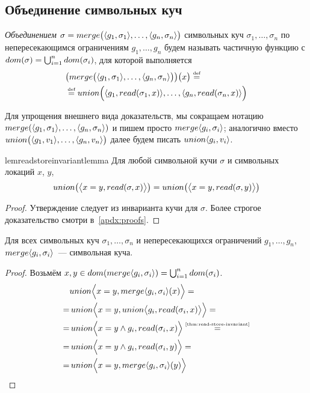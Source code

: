 \subsection{Объединение символьных куч}
%
%
\begin{defn}\label{def:heap-merge}
\emph{Объединением} $\sigma=merge\big(\langle g_1, \sigma_1\rangle,\ldots,\langle g_n, \sigma_n\rangle\big)$ символьных куч $\sigma_1,\ldots,\sigma_n$ по непересекающимся ограничениям $g_1,\ldots,g_n$ будем называть частичную функцию с $dom(\sigma)=\bigcup_{i=1}^{n}{dom(\sigma_i)}$, для которой выполняется
\begin{align*}
&\big(merge\big(\langle g_1, \sigma_1\rangle,\ldots,\langle g_n, \sigma_n\rangle\big)\big)\big(x\big)\mathrel{\stackrel{\mbox{\normalfont\tiny def}}{=}}\\
&\mathrel{\stackrel{\mbox{\normalfont\tiny def}}{=}}union\Big(\langle g_1, read(\sigma_1,x)\rangle,\ldots,\langle g_n, read(\sigma_n,x)\rangle\Big)
\end{align*}
\end{defn}
%
Для упрощения внешнего вида доказательств, мы сокращаем нотацию $merge(\langle g_1, \sigma_1\rangle,\ldots,\langle g_n, \sigma_n\rangle)$ и пишем просто $merge{\langle g_i, \sigma_i\rangle}$; аналогично вместо $union\big(\langle g_1, v_1\rangle,\ldots,\langle g_n, v_n\rangle\big)$ далее будем писать $union{\langle g_i, v_i\rangle}$.
%
\begin{restatable}{lem}{readstoreinvariantlemma}\label{thm:read-store-invariant}
Для любой символьной кучи $\sigma$ и символьных локаций $x$, $y$,
\begin{align*}
	union\big(\big\langle x=y, read(\sigma,x)\big\rangle\big)=union\big(\big\langle x=y, read(\sigma,y)\big\rangle\big)
\end{align*}
\end{restatable}
\begin{proof}
Утверждение следует из инварианта кучи для $\sigma$. Более строгое доказательство смотри в~\autoref{apdx:proofs}.
\end{proof}
%
\begin{thm}
Для всех символьных куч $\sigma_1,\ldots,\sigma_n$ и непересекающихся ограничений $g_1,\ldots,g_n$,\\
$merge\langle g_i, \sigma_i\rangle$~--- символьная куча.
\end{thm}
\begin{proof}
Возьмём $x, y \in dom(merge\langle g_i, \sigma_i\rangle)=\bigcup_{i=1}^{n}{dom(\sigma_i)}$.
\begin{align*}
&\aunion{\Pair{\mg{x}{y}}{\amerge\pair{g_i}{\sigma_i}(x)}}=\\
=&\,\aunion{\Pair{\mg{x}{y}}{\aunion\paiR{g_i}{\deref{\sigma_i}{x}}}}=\\
=&\,\aunion\Pair{\mg{x}{y}\wedge g_i}{\deref{\sigma_i}{x}}\eqby{\autoref{thm:read-store-invariant}}\\
=&\,\aunion\Pair{\mg{x}{y}\wedge g_i}{\deref{\sigma_i}{y}}=\\
=&\,\aunion{\Pair{\mg{x}{y}}{\amerge\pair{g_i}{\sigma_i}(y)}}
\end{align*}
\end{proof}
